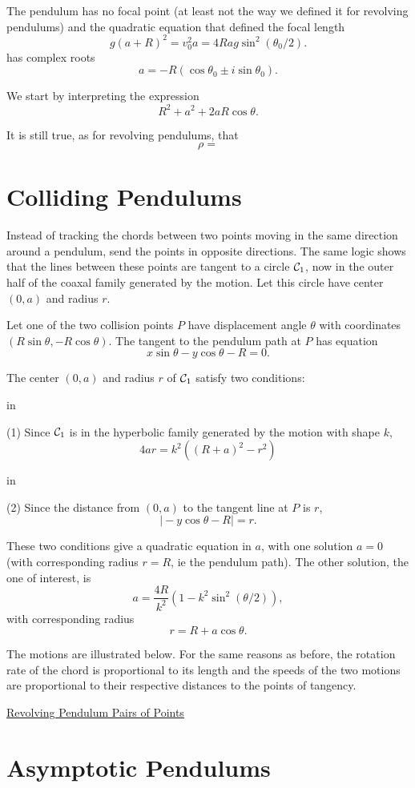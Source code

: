 \documentclass{ximera}
\newcommand{\pskip}{\vskip 0.1 in}
\begin{document}
The pendulum has no focal point (at least not the way we defined it for revolving pendulums) and the quadratic equation that defined the focal length 
\[
     g(a+R)^2 = v_0^2 a = 4Rag\sin^2 (\theta_0/2) .
\]
has complex roots
\[
     a = -R(\cos \theta_0 \pm i \sin \theta_0).
\]

We start by interpreting the expression
\[
       R^2 + a^2 + 2aR\cos\theta.
\]


It is still true, as for revolving pendulums, that
\[
  \rho = 
\]


\section*{Colliding Pendulums}
Instead of tracking the chords between two points moving in the same direction around a pendulum, send the points in opposite directions. The same logic shows that the lines between these points are tangent to a circle ${\cal C}_1$, now  in the outer half of the coaxal family generated by the motion. Let this circle have center $(0,a)$ and radius $r$.

Let one of the two collision points $P$ have displacement angle $\theta$ with coordinates $(R\sin\theta, -R \cos\theta)$. The tangent to the pendulum path at $P$ has equation
\[
       x\sin \theta - y\cos\theta - R = 0.
\]

The center $(0,a)$ and radius $r$ of ${\cal C}_1$ satisfy two conditions:

\pskip

(1) Since ${\cal C}_1$ is in the hyperbolic family generated by the motion with shape $k$,
\[
      4ar = k^2 \left(  (R+a)^2 - r^2   \right)
\]

\pskip

(2) Since the distance from $(0,a)$ to the tangent line at $P$ is $r$, 
\[
     \Big|  -y \cos \theta - R  \Big| = r .
\] 

These two conditions give a quadratic equation in $a$, with one solution $a=0$ (with corresponding radius $r=R$, ie the pendulum path). The other solution, the one of interest, is
\[
     a = \frac{4R}{k^2} \left( 1 - k^2 \sin^2 (\theta/2)    \right) ,
\]
with corresponding radius
\[
  r = R + a\cos \theta .
\]

The motions are illustrated below. For the same reasons as before, the rotation rate of the chord is proportional to its length and the speeds of the two motions are proportional to their respective distances to the points of tangency.

\begin{onlineOnly}
    \begin{center}
\end{center}
\end{onlineOnly}

\href{https://www.desmos.com/calculator/5vecnkcwou}{Revolving Pendulum Pairs of Points}


\section*{Asymptotic Pendulums}
\end{document}
